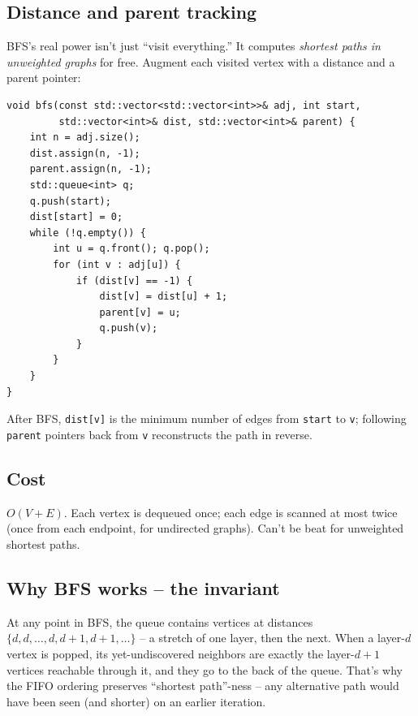 \documentclass[11pt]{article}
\begin{document}
\subsection*{Distance and parent tracking}

BFS's real power isn't just ``visit everything.'' It computes \emph{shortest paths in unweighted graphs} for free. Augment each visited vertex with a distance and a parent pointer:

\begin{lstlisting}[basicstyle=\ttfamily\small,frame=single]
void bfs(const std::vector<std::vector<int>>& adj, int start,
         std::vector<int>& dist, std::vector<int>& parent) {
    int n = adj.size();
    dist.assign(n, -1);
    parent.assign(n, -1);
    std::queue<int> q;
    q.push(start);
    dist[start] = 0;
    while (!q.empty()) {
        int u = q.front(); q.pop();
        for (int v : adj[u]) {
            if (dist[v] == -1) {
                dist[v] = dist[u] + 1;
                parent[v] = u;
                q.push(v);
            }
        }
    }
}
\end{lstlisting}

After BFS, \texttt{dist[v]} is the minimum number of edges from \texttt{start} to \texttt{v}; following \texttt{parent} pointers back from \texttt{v} reconstructs the path in reverse.

\subsection*{Cost}

$O(V + E)$. Each vertex is dequeued once; each edge is scanned at most twice (once from each endpoint, for undirected graphs). Can't be beat for unweighted shortest paths.

\subsection*{Why BFS works -- the invariant}

\begin{ideabox}
At any point in BFS, the queue contains vertices at distances $\{d, d, \ldots, d, d+1, d+1, \ldots\}$ -- a stretch of one layer, then the next. When a layer-$d$ vertex is popped, its yet-undiscovered neighbors are exactly the layer-$d+1$ vertices reachable through it, and they go to the back of the queue. That's why the FIFO ordering preserves ``shortest path''-ness -- any alternative path would have been seen (and shorter) on an earlier iteration.
\end{ideabox}
\end{document}
